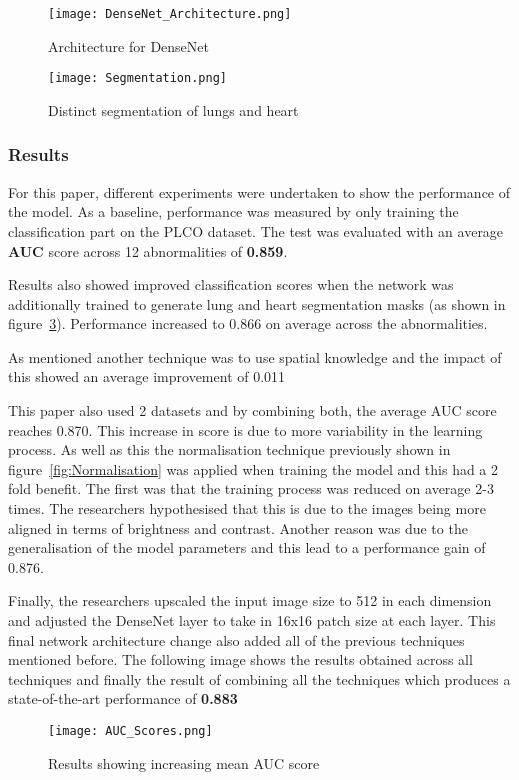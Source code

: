 \begin{figure}[H]
	\centering
	\texttt{[image: DenseNet\_Architecture.png]}
	\caption{Architecture for DenseNet}
	\label{fig:DenseNet}
\end{figure}

\begin{figure}[H]
	\centering
	\texttt{[image: Segmentation.png]}
	\caption{Distinct segmentation of lungs and heart}
	\label{fig:Segmentation}
\end{figure}



\subsubsection{Results}


For this paper, different experiments were undertaken to show the performance of the model. As a baseline, performance was measured by only training the classification part on the PLCO dataset. The test was evaluated with an average \textbf{AUC} score across 12 abnormalities of \textbf{0.859}. \par
Results also showed improved classification scores when the network was additionally trained to generate lung and heart segmentation masks (as shown in  figure~\ref{fig:AUC}). Performance increased to 0.866 on average across the abnormalities. \par
As mentioned another technique was to use spatial knowledge and the impact of this showed an average improvement of 0.011\par
This paper also used 2 datasets and by combining both, the average AUC score reaches 0.870. This increase in score is due to more variability in the learning process. As well as this the normalisation technique previously shown in figure~\ref{fig:Normalisation} was applied when training the model and this had a 2 fold benefit. The first was that the training process was reduced on average 2-3 times. The researchers hypothesised that this is due to the images being more aligned in terms of brightness and contrast. Another reason was due to the generalisation of the model parameters and this lead to a performance gain of 0.876. \par
Finally, the researchers upscaled the input image size to 512 in each dimension and adjusted the DenseNet layer to take in 16x16 patch size at each layer. This final network architecture change also added all of the previous techniques mentioned before. The following image shows the results obtained across all techniques and finally the result of combining all the techniques which produces a state-of-the-art performance of \textbf{0.883}



\begin{figure}[H]
	\centering
	\texttt{[image: AUC\_Scores.png]}
	\caption{Results showing increasing mean AUC score}
	\label{fig:AUC}
\end{figure}